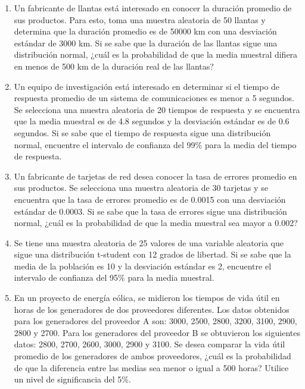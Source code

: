 \begin{Ejer}
\begin{enumerate}
\item Un fabricante de llantas est\'a interesado en conocer la duraci\'on promedio de sus productos. Para esto, toma una muestra aleatoria de 50 llantas y determina que la duraci\'on promedio es de 50000 km con una desviaci\'on est\'andar de 3000 km. Si se sabe que la duraci\'on de las llantas sigue una distribuci\'on normal, ¿cu\'al es la probabilidad de que la media muestral difiera en menos de 500 km de la duraci\'on real de las llantas?

\item Un equipo de investigaci\'on est\'a interesado en determinar si el tiempo de respuesta promedio de un sistema de comunicaciones es menor a 5 segundos. Se selecciona una muestra aleatoria de 20 tiempos de respuesta y se encuentra que la media muestral es de 4.8 segundos y la desviaci\'on est\'andar es de 0.6 segundos. Si se sabe que el tiempo de respuesta sigue una distribuci\'on normal, encuentre el intervalo de confianza del 99\% para la media del tiempo de respuesta.

\item Un fabricante de tarjetas de red desea conocer la tasa de errores promedio en sus productos. Se selecciona una muestra aleatoria de 30 tarjetas y se encuentra que la tasa de errores promedio es de 0.0015 con una desviaci\'on est\'andar de 0.0003. Si se sabe que la tasa de errores sigue una distribuci\'on normal, ¿cu\'al es la probabilidad de que la media muestral sea mayor a 0.002?

\item Se tiene una muestra aleatoria de 25 valores de una variable aleatoria que sigue una distribuci\'on t-student con 12 grados de libertad. Si se sabe que la media de la poblaci\'on es 10 y la desviaci\'on est\'andar es 2, encuentre el intervalo de confianza del 95\% para la media muestral.

\item En un proyecto de energ\'ia e\'olica, se midieron los tiempos de vida \'util en horas de los generadores de dos proveedores diferentes. Los datos obtenidos para los generadores del proveedor A son: 3000, 2500, 2800, 3200, 3100, 2900, 2800 y 2700. Para los generadores del proveedor B se obtuvieron los siguientes datos: 2800, 2700, 2600, 3000, 2900 y 3100. Se desea comparar la vida \'util promedio de los generadores de ambos proveedores, ¿cu\'al es la probabilidad de que la diferencia entre las medias sea menor o igual a 500 horas? Utilice un nivel de significancia del 5\%.


\end{enumerate}
\end{Ejer}
